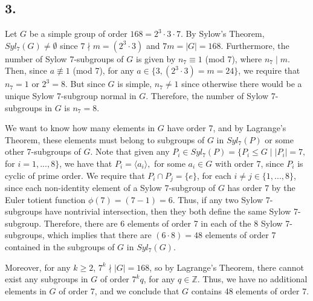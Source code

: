 \subsection*{3.}
Let $G$ be a simple group of order $168 = 2^3 \cdot 3 \cdot 7$. By Sylow's Theorem, $Syl_7(G) \not= \emptyset$ since $7 \nmid m = (2^3 \cdot 3)$ and $7m = |G| = 168$. Furthermore, the number of Sylow 7-subgroups of $G$ is given by $n_7 \equiv 1$ (mod 7), where $n_7 \mid m$. Then, since $a \not\equiv 1$ (mod 7), for any $a \in \{3,(2^3\cdot3)=m=24\}$, we require that $n_7 = 1$ or $2^3=8$. But since $G$ is simple, $n_7 \not= 1$ since otherwise there would be a unique Sylow 7-subgroup normal in $G$. Therefore, the number of Sylow 7-subgroups in $G$ is $n_7 = 8$.

We want to know how many elements in $G$ have order 7, and by Lagrange's Theorem, these elements must belong to subgroups of $G$ in $Syl_7(P)$ or some other 7-subgroups of $G$. Note that given any $P_i \in Syl_7(P) = \{P_i \le G \mid |P_i| = 7,$ for $i = 1,...,8\}$, we have that $P_i = \langle a_i \rangle,$ for some $a_i \in G$ with order 7, since $P_i$ is cyclic of prime order. We require that $P_i \cap P_j = \{e\}$, for each $i \not= j \in \{1,...,8\}$, since each non-identity element of a Sylow 7-subgroup of $G$ has order 7 by the Euler totient function $\phi(7) = (7-1) = 6$. Thus, if any two Sylow 7-subgroups have nontrivial intersection, then they both define the same Sylow 7-subgroup. Therefore, there are 6 elements of order 7 in each of the 8 Sylow 7-subgroups, which implies that there are $(6\cdot8)=48$ elements of order 7 contained in the subgroups of $G$ in $Syl_7(G)$.

Moreover, for any $k \ge 2$, $7^k \nmid |G|=168$, so by Lagrange's Theorem, there cannot exist any subgroups in $G$ of order $7^kq$, for any $q \in \mathbb{Z}$. Thus, we have no additional elements in $G$ of order 7, and we conclude that $G$ contains 48 elements of order 7.
